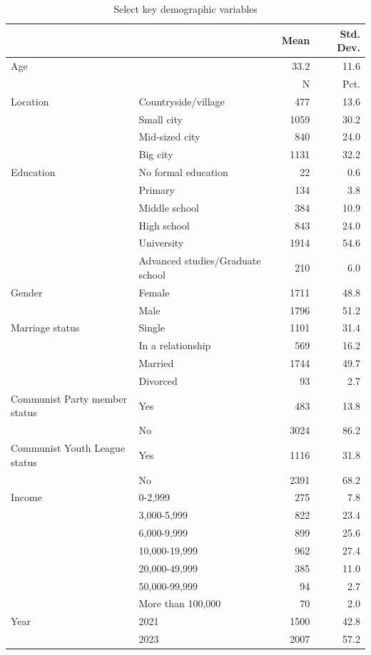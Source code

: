 \documentclass[
  letterpaper,
  DIV=11,
  numbers=noendperiod]{scrartcl}
\begin{document}
\begin{longtable}[t]{llrr}

\caption{\label{tbl-demographics}Select key demographic variables}

\tabularnewline

\toprule
  &    & Mean & Std. Dev.\\
\midrule
Age &  & 33.2 & 11.6\\
\midrule
 &  & N & Pct.\\
Location & Countryside/village & 477 & 13.6\\
 & Small city & 1059 & 30.2\\
 & Mid-sized city & 840 & 24.0\\
 & Big city & 1131 & 32.2\\
Education & No formal education & 22 & 0.6\\
 & Primary & 134 & 3.8\\
 & Middle school & 384 & 10.9\\
 & High school & 843 & 24.0\\
 & University & 1914 & 54.6\\
 & Advanced studies/Graduate school & 210 & 6.0\\
Gender & Female & 1711 & 48.8\\
 & Male & 1796 & 51.2\\
Marriage status & Single & 1101 & 31.4\\
 & In a relationship & 569 & 16.2\\
 & Married & 1744 & 49.7\\
 & Divorced & 93 & 2.7\\
Communist Party member status & Yes & 483 & 13.8\\
 & No & 3024 & 86.2\\
Communist Youth League status & Yes & 1116 & 31.8\\
 & No & 2391 & 68.2\\
Income & 0-2,999 & 275 & 7.8\\
 & 3,000-5,999 & 822 & 23.4\\
 & 6,000-9,999 & 899 & 25.6\\
 & 10,000-19,999 & 962 & 27.4\\
 & 20,000-49,999 & 385 & 11.0\\
 & 50,000-99,999 & 94 & 2.7\\
 & More than 100,000 & 70 & 2.0\\
Year & 2021 & 1500 & 42.8\\
 & 2023 & 2007 & 57.2\\
\bottomrule

\end{longtable}
\end{document}
